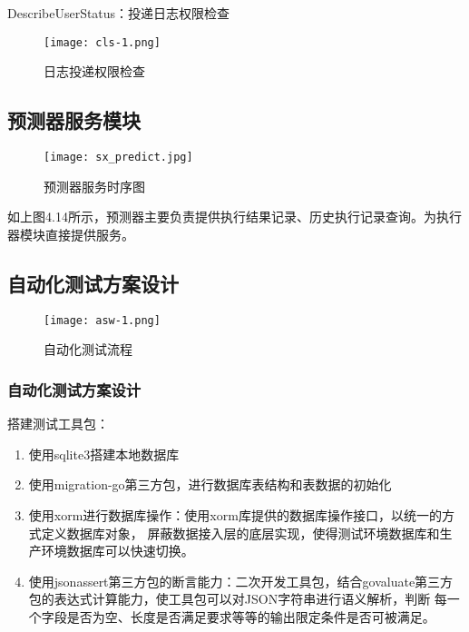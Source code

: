 DescribeUserStatus：投递日志权限检查

\begin{figure}[H]
    \centering
    \texttt{[image: cls-1.png]}
    \caption{日志投递权限检查}
    \label{fig:rztdqx}
\end{figure}


\subsection{预测器服务模块}

\begin{figure}[H]
    \centering
    \texttt{[image: sx\_predict.jpg]}
    \caption{预测器服务时序图}
    \label{fig:预测器服务时序图}
\end{figure}

如上图4.14所示，预测器主要负责提供执行结果记录、历史执行记录查询。为执行器模块直接提供服务。\cite{le2021deep}



\subsection{自动化测试方案设计}

\begin{figure}[H]
    \centering
    \texttt{[image: asw-1.png]}
    \caption{自动化测试流程}
    \label{fig:自动化测试流程}
\end{figure}



\subsubsection{自动化测试方案设计}

搭建测试工具包：
\begin{enumerate}
    \item 使用sqlite3搭建本地数据库
    \item 使用migration-go第三方包，进行数据库表结构和表数据的初始化
    \item 使用xorm进行数据库操作：使用xorm库提供的数据库操作接口，以统一的方式定义数据库对象，
屏蔽数据接入层的底层实现，使得测试环境数据库和生产环境数据库可以快速切换。
    \item 使用jsonassert第三方包的断言能力：二次开发工具包，结合govaluate第三方包的表达式计算能力，使工具包可以对JSON字符串进行语义解析，判断
每一个字段是否为空、长度是否满足要求等等的输出限定条件是否可被满足。
\end{enumerate}

